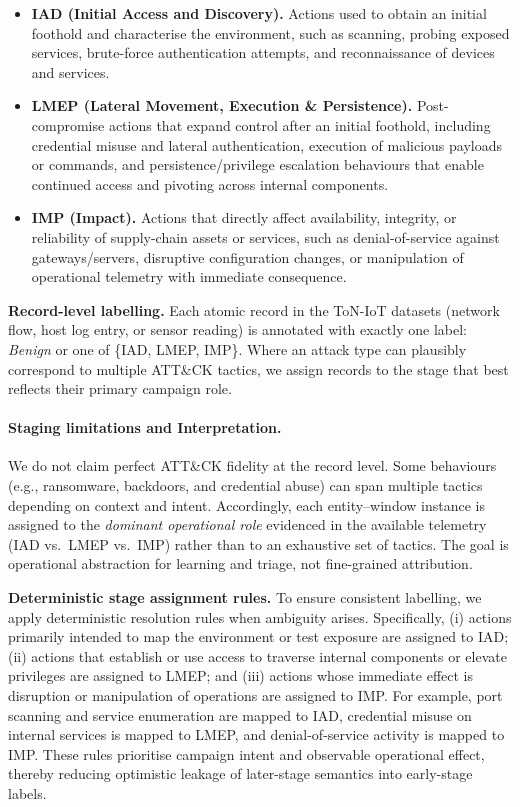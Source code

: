 \documentclass[pdflatex,sn-mathphys-num]{sn-jnl}
\theoremstyle{thmstyleone}%
\theoremstyle{thmstyletwo}%
\theoremstyle{thmstylethree}%
\begin{document}
\begin{itemize}
    \item \textbf{IAD (Initial Access and Discovery).} Actions used to obtain an initial foothold and characterise the environment, such as scanning, probing exposed services, brute-force authentication attempts, and reconnaissance of devices and services.
    \item \textbf{LMEP (Lateral Movement, Execution \& Persistence).} Post-compromise actions that expand control after an initial foothold, including credential misuse and lateral authentication, execution of malicious payloads or commands, and persistence/privilege escalation behaviours that enable continued access and pivoting across internal components.
    \item \textbf{IMP (Impact).} Actions that directly affect availability, integrity, or reliability of supply-chain assets or services, such as denial-of-service against gateways/servers, disruptive configuration changes, or manipulation of operational telemetry with immediate consequence.
\end{itemize}

\textbf{Record-level labelling.} Each atomic record in the ToN-IoT datasets (network flow, host log entry, or sensor reading) is annotated with exactly one label: \emph{Benign} or one of \{IAD, LMEP, IMP\}. Where an attack type can plausibly correspond to multiple ATT\&CK tactics, we assign records to the stage that best reflects their primary campaign role.

\paragraph{Staging limitations and Interpretation.}
We do not claim perfect ATT\&CK fidelity at the record level. Some behaviours (e.g., ransomware, backdoors, and credential abuse) can span multiple tactics depending on context and intent. Accordingly, each entity--window instance is assigned to the \emph{dominant operational role} evidenced in the available telemetry (IAD vs.\ LMEP vs.\ IMP) rather than to an exhaustive set of tactics. The goal is operational abstraction for learning and triage, not fine-grained attribution.

\textbf{Deterministic stage assignment rules.} To ensure consistent labelling, we apply deterministic resolution rules when ambiguity arises. Specifically, (i) actions primarily intended to map the environment or test exposure are assigned to IAD; (ii) actions that establish or use access to traverse internal components or elevate privileges are assigned to LMEP; and (iii) actions whose immediate effect is disruption or manipulation of operations are assigned to IMP. For example, port scanning and service enumeration are mapped to IAD, credential misuse on internal services is mapped to LMEP, and denial-of-service activity is mapped to IMP. These rules prioritise campaign intent and observable operational effect, thereby reducing optimistic leakage of later-stage semantics into early-stage labels.
\end{document}
